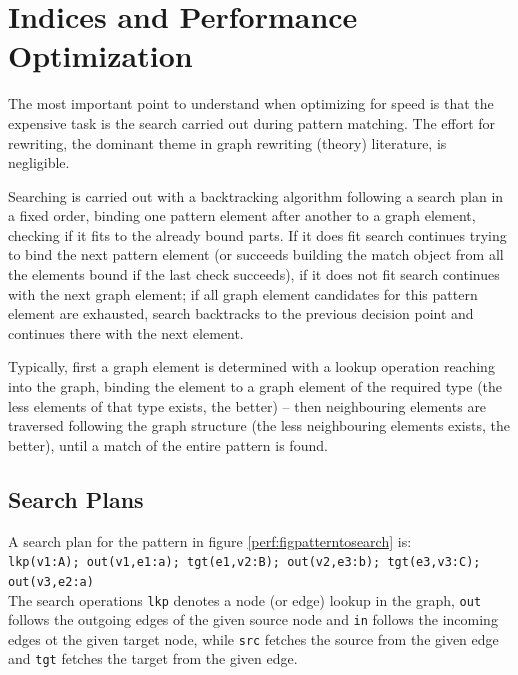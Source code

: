 \chapter{Indices and Performance Optimization}\label{sec:performance} 

The most important point to understand when optimizing for speed is that the expensive task is the search carried out during pattern matching. The effort for rewriting, the dominant theme in graph rewriting (theory) literature, is negligible.

Searching is carried out with a backtracking algorithm following a search plan in a fixed order, 
binding one pattern element after another to a graph element, checking if it fits to the already bound parts.
If it does fit search continues trying to bind the next pattern element (or succeeds building the match object from all the elements bound if the last check succeeds), if it does not fit search continues with the next graph element; if all graph element candidates for this pattern element are exhausted, search backtracks to the previous decision point and continues there with the next element.

Typically, first a graph element is determined with a lookup operation reaching into the graph, binding the element to a graph element of the required type (the less elements of that type exists, the better) -- then neighbouring elements are traversed following the graph structure (the less neighbouring elements exists, the better), until a match of the entire pattern is found.


\section{Search Plans}

A search plan for the pattern in figure \ref{perf:figpatterntosearch} is:\\
\texttt{lkp(v1:A); out(v1,e1:a); tgt(e1,v2:B); out(v2,e3:b); tgt(e3,v3:C); out(v3,e2:a)}\\
The search operations \texttt{lkp} denotes a node (or edge) lookup in the graph, \texttt{out} follows the outgoing edges of the given source node and \texttt{in} follows the incoming edges ot the given target node, while \texttt{src} fetches the source from the given edge and \texttt{tgt} fetches the target from the given edge.

